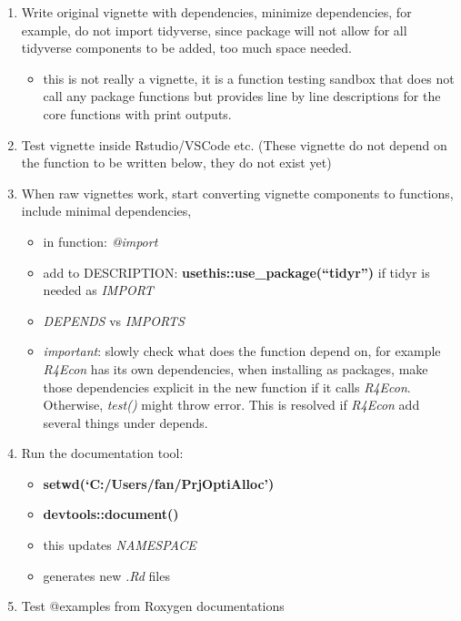 \documentclass[
]{article}
\providecommand{\tightlist}{%
  \setlength{\itemsep}{0pt}\setlength{\parskip}{0pt}}
\begin{document}
\begin{enumerate}
\def\labelenumi{\arabic{enumi}.}
\tightlist
\item
  Write original vignette with dependencies, minimize dependencies, for
  example, do not import tidyverse, since package will not allow for all
  tidyverse components to be added, too much space needed.

  \begin{itemize}
  \tightlist
  \item
    this is not really a vignette, it is a function testing sandbox that
    does not call any package functions but provides line by line
    descriptions for the core functions with print outputs.
  \end{itemize}
\item
  Test vignette inside Rstudio/VSCode etc. (These vignette do not depend
  on the function to be written below, they do not exist yet)
\item
  When raw vignettes work, start converting vignette components to
  functions, include minimal dependencies,

  \begin{itemize}
  \tightlist
  \item
    in function: \emph{@import}
  \item
    add to DESCRIPTION: \textbf{usethis::use\_package(``tidyr'')} if
    tidyr is needed as \emph{IMPORT}
  \item
    \emph{DEPENDS} vs \emph{IMPORTS}
  \item
    \emph{important}: slowly check what does the function depend on, for
    example \emph{R4Econ} has its own dependencies, when installing as
    packages, make those dependencies explicit in the new function if it
    calls \emph{R4Econ}. Otherwise, \emph{test()} might throw error.
    This is resolved if \emph{R4Econ} add several things under depends.
  \end{itemize}
\item
  Run the documentation tool:

  \begin{itemize}
  \tightlist
  \item
    \textbf{setwd(`C:/Users/fan/PrjOptiAlloc')}
  \item
    \textbf{devtools::document()}
  \item
    this updates \emph{NAMESPACE}
  \item
    generates new \emph{.Rd} files
  \end{itemize}
\item
  Test @examples from Roxygen documentations


\end{enumerate}
\end{document}
